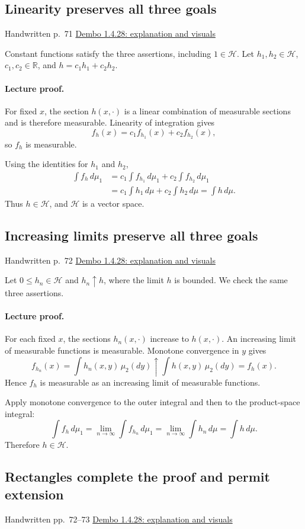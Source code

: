 \documentclass[11pt,letterpaper]{article}
\newcommand{\lecturesection}[1]{\subsection{#1}}
\begin{document}
\hypertarget{l8-s7}{}
\lecturesection{Linearity preserves all three goals}
{\small\textcolor{lectureink}{Handwritten p.\ 71} \quad \href{https://josephrbailey.com/probability/\#entry-1-4-28}{Dembo 1.4.28: explanation and visuals}}

Constant functions satisfy the three assertions, including $1\in\mathcal H$. Let $h_1,h_2\in\mathcal H$, $c_1,c_2\in\mathbb R$, and $h=c_1h_1+c_2h_2$.

\paragraph{Lecture proof.}
For fixed $x$, the section $h(x,\cdot)$ is a linear combination of measurable sections and is therefore measurable. Linearity of integration gives \[f_h(x)=c_1f_{h_1}(x)+c_2f_{h_2}(x),\] so $f_h$ is measurable.

Using the identities for $h_1$ and $h_2$, \[\begin{aligned}\int f_h\,d\mu_1&=c_1\int f_{h_1}\,d\mu_1+c_2\int f_{h_2}\,d\mu_1\\&=c_1\int h_1\,d\mu+c_2\int h_2\,d\mu=\int h\,d\mu.\end{aligned}\] Thus $h\in\mathcal H$, and $\mathcal H$ is a vector space.

\hypertarget{l8-s8}{}
\lecturesection{Increasing limits preserve all three goals}
{\small\textcolor{lectureink}{Handwritten p.\ 72} \quad \href{https://josephrbailey.com/probability/\#entry-1-4-28}{Dembo 1.4.28: explanation and visuals}}

Let $0\le h_n\in\mathcal H$ and $h_n\uparrow h$, where the limit $h$ is bounded. We check the same three assertions.

\paragraph{Lecture proof.}
For each fixed $x$, the sections $h_n(x,\cdot)$ increase to $h(x,\cdot)$. An increasing limit of measurable functions is measurable. Monotone convergence in $y$ gives \[f_{h_n}(x)=\int h_n(x,y)\,\mu_2(dy)\uparrow\int h(x,y)\,\mu_2(dy)=f_h(x).\] Hence $f_h$ is measurable as an increasing limit of measurable functions.

Apply monotone convergence to the outer integral and then to the product-space integral: \[\int f_h\,d\mu_1=\lim_{n\to\infty}\int f_{h_n}\,d\mu_1=\lim_{n\to\infty}\int h_n\,d\mu=\int h\,d\mu.\] Therefore $h\in\mathcal H$.

\hypertarget{l8-s9}{}
\lecturesection{Rectangles complete the proof and permit extension}
{\small\textcolor{lectureink}{Handwritten pp.\ 72--73} \quad \href{https://josephrbailey.com/probability/\#entry-1-4-28}{Dembo 1.4.28: explanation and visuals}}
\end{document}
